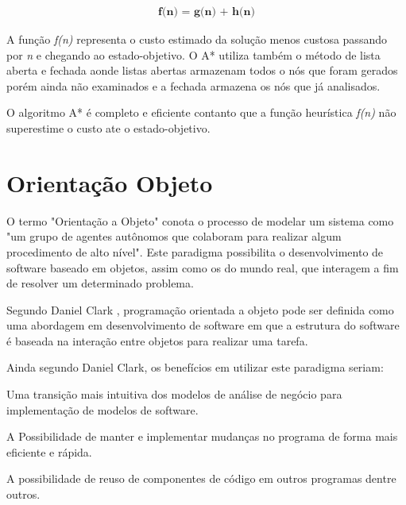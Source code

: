 \begin{align*}
    \textbf{f(n) = g(n) + h(n)}
\end{align*}


A função \textit{f(n)} representa o custo estimado da solução menos custosa passando por \textit{n} e chegando ao estado-objetivo. O A* utiliza também o método de lista aberta e fechada aonde listas abertas armazenam todos o nós que foram gerados porém ainda não examinados e a fechada armazena os nós que já analisados.

O algoritmo A* é completo e eficiente contanto que a função heurística \textit{f(n)} não superestime o custo ate o estado-objetivo.
\cite{aestar}

\section{Orientação Objeto}
\label{sec:orientação-objeto}	

O termo "Orientação a Objeto" conota o processo de modelar um sistema como "um grupo de agentes autônomos que colaboram para realizar algum procedimento de alto nível".  
Este paradigma possibilita o desenvolvimento de software baseado em objetos, assim como os do mundo real,  que interagem a fim de resolver um determinado problema.  
  
Segundo Daniel Clark , programação orientada a objeto pode ser definida como uma abordagem em desenvolvimento de software em que a estrutura do software é baseada na interação entre objetos para realizar uma tarefa.  
  
Ainda segundo Daniel Clark, os benefícios em utilizar este paradigma seriam: 

  \begin{alineascomponto}
\item Uma transição mais intuitiva dos modelos de análise de negócio para implementação de modelos de software.  
  
\item A Possibilidade de manter e implementar mudanças no programa de forma mais eficiente e rápida.

\item A possibilidade de reuso de componentes de código em outros programas dentre outros. 
\end {alineascomponto}
\cite{dan}


